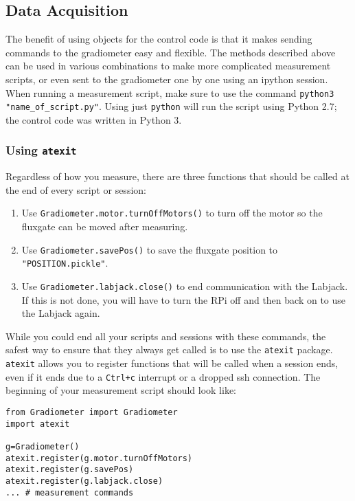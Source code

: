 \documentclass{TheMartianReport}
\newcommand{\pyinline}[1]{\texttt{#1}}
\newcommand{\shellinline}[1]{\texttt{#1}}
\begin{document}
\subsection{Data Acquisition} \label{subsec:Acquisition}
The benefit of using objects for the control code is that it makes sending commands to the gradiometer easy and flexible. The methods described above can be used in various combinations to make more complicated measurement scripts, or even sent to the gradiometer one by one using an ipython session. When running a measurement script, make sure to use the command \shellinline{python3 "name_of_script.py"}. Using just \shellinline{python} will run the script using Python 2.7; the control code was written in Python 3.

\subsubsection{Using \pyinline{atexit}}
Regardless of how you measure, there are three functions that should be called at the end of every script or session:
\begin{enumerate}
	\item Use \pyinline{Gradiometer.motor.turnOffMotors()} to turn off the motor so the fluxgate can be moved after measuring.
	\item Use \pyinline{Gradiometer.savePos()} to save the fluxgate position to \shellinline{"POSITION.pickle"}.
	\item Use \pyinline{Gradiometer.labjack.close()} to end communication with the Labjack. If this is not done, you will have to turn the RPi off and then back on to use the Labjack again.
\end{enumerate}
While you could end all your scripts and sessions with these commands, the safest way to ensure that they always get called is to use the \pyinline{atexit} package. \pyinline{atexit} allows you to register functions that will be called when a session ends, even if it ends due to a \shellinline{Ctrl+c} interrupt or a dropped ssh connection. The beginning of your measurement script should look like:
\begin{verbatim}
from Gradiometer import Gradiometer
import atexit

g=Gradiometer()
atexit.register(g.motor.turnOffMotors)
atexit.register(g.savePos)
atexit.register(g.labjack.close)
... # measurement commands
\end{verbatim}
\end{document}
